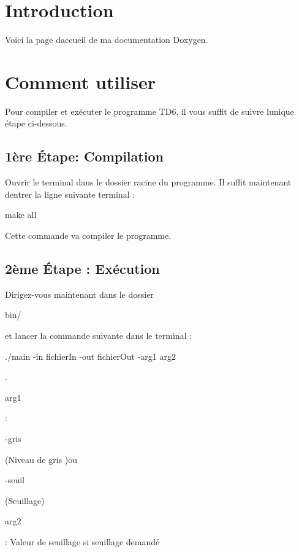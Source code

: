 \hypertarget{index_intro_sec}{}\section{Introduction}\label{index_intro_sec}
Voici la page d\textquotesingle{}accueil de ma documentation Doxygen. \hypertarget{index_howto_sec}{}\section{Comment utiliser}\label{index_howto_sec}
Pour compiler et exécuter le programme T\+D6, il vous suffit de suivre l\textquotesingle{}unique étape ci-\/dessous. \hypertarget{index_etape1}{}\subsection{1ère Étape\+: Compilation}\label{index_etape1}
Ouvrir le terminal dans le dossier racine du programme. Il suffit maintenant d\textquotesingle{}entrer la ligne suivante terminal \+:

\begin{DoxyVerb}make all
\end{DoxyVerb}
 Cette commande va compiler le programme. \hypertarget{index_etape2}{}\subsection{2ème Étape \+: Exécution}\label{index_etape2}
Dirigez-\/vous maintenant dans le dossier\begin{DoxyVerb}bin/ \end{DoxyVerb}
 et lancer la commande suivante dans le terminal \+:\begin{DoxyVerb}./main -in fichierIn -out fichierOut -arg1 arg2 \end{DoxyVerb}
. \begin{DoxyVerb}arg1 \end{DoxyVerb}
 \+:\begin{DoxyVerb}-gris \end{DoxyVerb}
 (Niveau de gris )ou\begin{DoxyVerb}-seuil \end{DoxyVerb}
 (Seuillage) \begin{DoxyVerb}arg2 \end{DoxyVerb}
 \+: Valeur de seuillage si seuillage demandé 